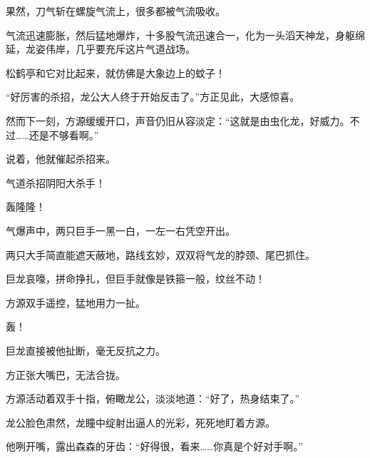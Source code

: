 \begin{this_body}
果然，刀气斩在螺旋气流上，很多都被气流吸收。

气流迅速膨胀，然后猛地爆炸，十多股气流迅速合一，化为一头滔天神龙，身躯绵延，龙姿伟岸，几乎要充斥这片气道战场。

松鹤亭和它对比起来，就仿佛是大象边上的蚊子！

“好厉害的杀招，龙公大人终于开始反击了。”方正见此，大感惊喜。

然而下一刻，方源缓缓开口，声音仍旧从容淡定：“这就是由虫化龙，好威力。不过……还是不够看啊。”

说着，他就催起杀招来。

气道杀招阴阳大杀手！

轰隆隆！

气爆声中，两只巨手一黑一白，一左一右凭空开出。

两只大手简直能遮天蔽地，路线玄妙，双双将气龙的脖颈、尾巴抓住。

巨龙哀嚎，拼命挣扎，但巨手就像是铁箍一般，纹丝不动！

方源双手遥控，猛地用力一扯。

轰！

巨龙直接被他扯断，毫无反抗之力。

方正张大嘴巴，无法合拢。

方源活动着双手十指，俯瞰龙公，淡淡地道：“好了，热身结束了。”

龙公脸色肃然，龙瞳中绽射出逼人的光彩，死死地盯着方源。

他咧开嘴，露出森森的牙齿：“好得很，看来……你真是个好对手啊。”

\end{this_body}

